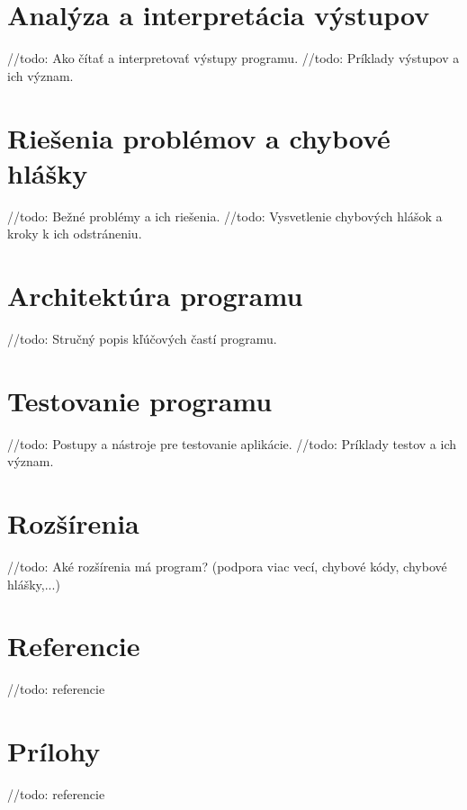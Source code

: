 \documentclass[a4paper, 11pt]{article}
\begin{document}
	\section{Analýza a interpretácia výstupov}
	//todo: Ako čítať a interpretovať výstupy programu.
	//todo: Príklady výstupov a ich význam.

	\section{Riešenia problémov a chybové hlášky}
	//todo: Bežné problémy a ich riešenia.
	//todo: Vysvetlenie chybových hlášok a kroky k ich odstráneniu.
	
	\section{Architektúra programu}
	//todo: Stručný popis kľúčových častí programu.

	\section{Testovanie programu}
	//todo: Postupy a nástroje pre testovanie aplikácie.
	//todo: Príklady testov a ich význam.

	\section{Rozšírenia}
	//todo: Aké rozšírenia má program? (podpora viac vecí, chybové kódy, chybové hlášky,...)

	\section{Referencie}
	//todo: referencie

	\section{Prílohy}
	//todo: referencie
\end{document}
